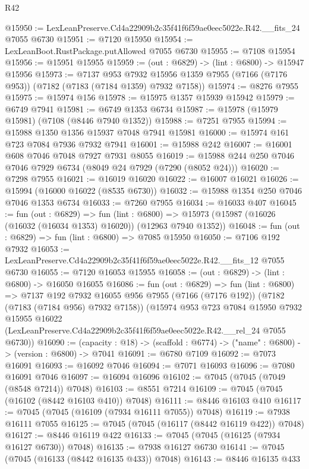 \begin{lexlean}{R42}
\begin{coremodule}
{@15950 := LexLeanPreserve.Cd4a22909b2c35f41f6f59ae0eec5022e.R42.__fits_24 @7055 @6730
@15951 := @7120 @15950
@15954 := LexLeanBoot.RustPackage.putAllowed @7055 @6730
@15955 := @7108 @15954
@15956 := @15951 @15955
@15959 := (out : @6829) -> (lint : @6800) -> @15947 @15956
@15973 := @7137
    @953
    @7932
    @15956
    @1359
    @7955
    (@7166 (@7176 @953))
    (@7182 (@7183 (@7184 @1359) @7932 @7158))
@15974 := @8276 @7955
@15975 := @15974 @156
@15978 := @15975 @1357 @15939 @15942
@15979 := @6749 @7941
@15981 := @6749 @1353 @6734
@15987 := @15978 (@15979 @15981) (@7108 (@8446 @7940 @1352))
@15988 := @7251 @7955
@15994 := @15988 @1350 @1356 @15937 @7048 @7941 @15981
@16000 := @15974 @161 @723 @7084 @7936 @7932 @7941
@16001 := @15988 @242
@16007 := @16001 @608 @7046 @7048 @7927 @7931 @8055
@16019 := @15988 @244 @250 @7046 @7046 @7929 @6734 (@8049 @24 @7929 (@7290 (@8052 @24)))
@16020 := @7298 @7955
@16021 := @16019 @16020
@16022 := @16007 @16021
@16026 := @15994 (@16000 @16022 (@8535 @6730))
@16032 := @15988 @1354 @250 @7046 @7046 @1353 @6734
@16033 := @7260 @7955
@16034 := @16033 @407
@16045 := fun (out : @6829) =>
  fun (lint : @6800) => @15973 (@15987 (@16026 (@16032 (@16034 @1353) @16020)) (@12963 @7940 @1352))
@16048 := fun (out : @6829) => fun (lint : @6800) => @7085 @15950
@16050 := @7106 @192 @7932
@16053 := LexLeanPreserve.Cd4a22909b2c35f41f6f59ae0eec5022e.R42.__fits_12 @7055 @6730
@16055 := @7120 @16053 @15955
@16058 := (out : @6829) -> (lint : @6800) -> @16050 @16055
@16086 := fun (out : @6829) =>
  fun (lint : @6800) =>
  @7137
    @192
    @7932
    @16055
    @956
    @7955
    (@7166 (@7176 @192))
    (@7182 (@7183 (@7184 @956) @7932 @7158))
    (@15974
      @953
      @723
      @7084
      @15950
      @7932
      @15955
      @16022
      (LexLeanPreserve.Cd4a22909b2c35f41f6f59ae0eec5022e.R42.__rel_24 @7055 @6730))
@16090 := (capacity : @18) -> (scaffold : @6774) -> ("name" : @6800) -> (version : @6800) -> @7041
@16091 := @6780 @7109
@16092 := @7073 @16091
@16093 := @16092 @7046
@16094 := @7071 @16093
@16096 := @7080 @16091 @7046
@16097 := @16094 @16096
@16102 := @7045 (@7045 (@7049 (@8548 @7214)) @7048)
@16103 := @8551 @7214
@16109 := @7045 (@7045 (@16102 (@8442 @16103 @410)) @7048)
@16111 := @8446 @16103 @410
@16117 := @7045 (@7045 (@16109 (@7934 @16111 @7055)) @7048)
@16119 := @7938 @16111 @7055
@16125 := @7045 (@7045 (@16117 (@8442 @16119 @422)) @7048)
@16127 := @8446 @16119 @422
@16133 := @7045 (@7045 (@16125 (@7934 @16127 @6730)) @7048)
@16135 := @7938 @16127 @6730
@16141 := @7045 (@7045 (@16133 (@8442 @16135 @433)) @7048)
@16143 := @8446 @16135 @433
}
\end{coremodule}
\end{lexlean}
